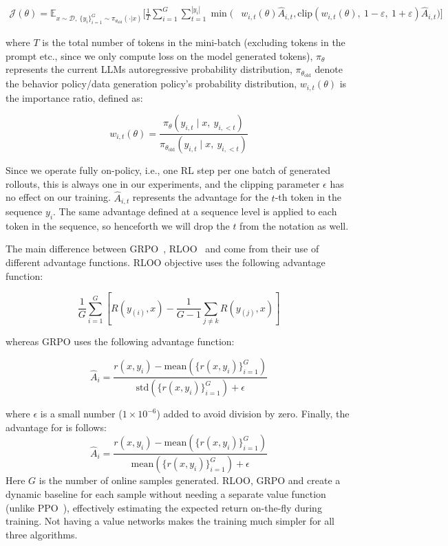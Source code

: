 \documentclass[10pt]{article} %
\begin{document}
\begin{align*}
\mathcal{J}(\theta) 
= \mathbb{E}_{x \sim \mathcal{D},\ \{y_i\}_{i=1}^G \sim \pi_{\theta_{\text{old}}}(\cdot|x)} 
\Bigg[ 
    \frac{1}{T} \sum_{i=1}^G \sum_{t=1}^{|y_i|} 
    \min \Big( & w_{i,t}(\theta) \hat{A}_{i,t}, 
     \text{clip}(w_{i,t}(\theta),\ 1 - \varepsilon,\ 1 + \varepsilon) \hat{A}_{i,t} 
    \Big) 
\Bigg]
\end{align*}

where $T$ is the total number of tokens in the mini-batch (excluding tokens in the prompt etc., since we only compute loss on the model generated tokens), $\pi_\theta$ represents the current LLMs autoregressive probability distribution, $\pi_{\theta_\text{old}}$ denote the behavior policy/data generation policy's probability distribution, $w_{i, t}(\theta)$ is the importance ratio, defined as:

$$w_{i,t}(\theta) = \frac{
    \pi_\theta(y_{i,t} \mid x,\ y_{i,<t})
}{
    \pi_{\theta_{\text{old}}}(y_{i,t} \mid x,\ y_{i,<t})
}$$

Since we operate fully on-policy, i.e., one RL step per one batch of generated rollouts, this is always one in our experiments, and the clipping parameter $\epsilon$ has no effect on our training. $\hat{A}_{i,t}$ represents the advantage for the $t$-th token in the sequence $y_i$. The same advantage defined at a sequence level is applied to each token in the sequence, so henceforth we will drop the $t$ from the notation as well.

The main difference between GRPO~\citep{shao2024deepseekmathpushinglimitsmathematical}, RLOO~\citep{ahmadian2024basicsrevisitingreinforcestyle} and \ours{} come from their use of different advantage functions. RLOO objective uses the following advantage function:

$$\frac{1}{G}\sum_{i=1}^{G}[R(y_{(i)},x) - \frac{1}{G-1}\sum_{j\neq k}R(y_{(j)},x)]$$

whereas GRPO uses the following advantage function:

$$\hat{A}_i = \frac{
    r(x, y_i) - \text{mean}\left( \{ r(x, y_i) \}_{i=1}^G \right)
}{
    \text{std}\left( \{ r(x, y_i) \}_{i=1}^G \right) + \epsilon
}$$

where $\epsilon$ is a small number ($1 \times 10^{-6}$) added to avoid division by zero. Finally, the advantage for \ours{} is follows:
$$\hat{A}_i = \frac{
    r(x, y_i) - \text{mean}\left( \{ r(x, y_i) \}_{i=1}^G \right)
}{
    \text{mean}\left( \{ r(x, y_i) \}_{i=1}^G \right) + \epsilon
}$$
Here $G$ is the number of online samples generated. RLOO, GRPO and \ours{} create a dynamic baseline for each sample without needing a separate value function (unlike PPO~\citep{schulman2017proximalpolicyoptimizationalgorithms}), effectively estimating the expected return on-the-fly during training. Not having a value networks makes the training much simpler for all three algorithms.
\end{document}
